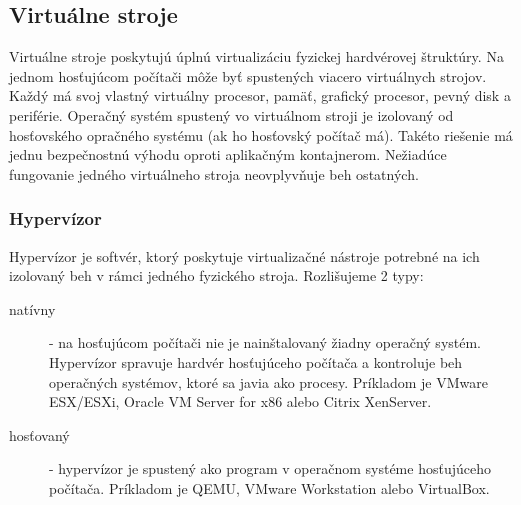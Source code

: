 \documentclass[12pt,twoside,color,cover,table]{fithesis3}
\begin{document}
\subsection{Virtuálne stroje}
Virtuálne stroje poskytujú úplnú virtualizáciu fyzickej hardvérovej štruktúry. Na jednom hosťujúcom počítači môže byť spustených viacero virtuálnych strojov. Každý má svoj vlastný virtuálny procesor, pamäť, grafický procesor, pevný disk 
a periférie. Operačný systém spustený vo virtuálnom stroji je izolovaný od hosťovského opračného systému (ak ho hosťovský počítač má). Takéto riešenie má jednu bezpečnostnú výhodu oproti aplikačným 
kontajnerom. Nežiadúce fungovanie jedného virtuálneho stroja neovplyvňuje beh ostatných.

\subsubsection{Hypervízor}
Hypervízor je softvér, ktorý poskytuje virtualizačné nástroje potrebné na ich izolovaný beh v rámci jedného fyzického stroja. Rozlišujeme 2 typy:
\begin{description}
\item[natívny] - na hosťujúcom počítači nie je nainštalovaný žiadny operačný systém. Hypervízor spravuje hardvér hosťujúceho počítača a kontroluje beh operačných systémov, ktoré sa javia ako procesy.
Príkladom je VMware ESX/ESXi, Oracle VM Server for x86 alebo Citrix XenServer.
\item[hosťovaný] - hypervízor je spustený ako program v operačnom systéme hosťujúceho počítača. Príkladom je QEMU, VMware Workstation alebo VirtualBox.
\end{description}
\cite{hypervisorTypes}
\end{document}
